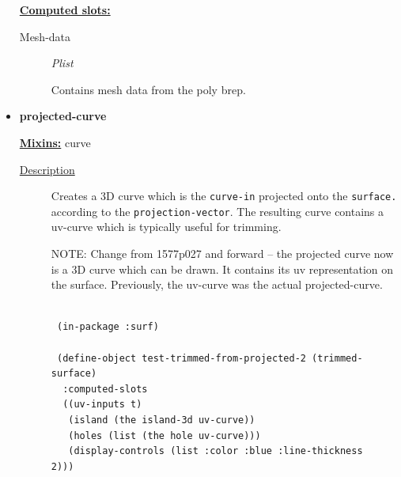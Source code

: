 \documentclass [11pt]{book}
\begin{document}
\begin{itemize}
\textbf{
\underline{Computed slots:}}

\begin{description}

\item [Mesh-data]
\emph{Plist}

 Contains mesh data from the poly brep.




\end{description}







\item {}
\label{prim:projected-curve}
\textbf{projected-curve}


\textbf{
\underline{Mixins:}} curve





\begin{description}

\item [
\underline{Description}]


Creates a 3D curve which is the \texttt{curve-in} 
projected onto the \texttt{surface.} according to the \texttt{projection-vector}. 
The resulting curve contains a uv-curve which is typically useful for trimming.

NOTE: Change from 1577p027 and forward -- the projected curve now is a 3D curve which 
can be drawn. It contains its uv representation on the surface. Previously, the uv-curve
was the actual projected-curve.





\end{description}




\begin{figure}
\begin{lrbox}{\boxedverb}
\begin{minipage}{\linewidth}
{\small

\begin{verbatim}

 (in-package :surf)

 (define-object test-trimmed-from-projected-2 (trimmed-surface)
  :computed-slots
  ((uv-inputs t)
   (island (the island-3d uv-curve))
   (holes (list (the hole uv-curve)))
   (display-controls (list :color :blue :line-thickness 2)))
  

\end{verbatim}}
\end{minipage}
\end{lrbox}
\end{figure}
\end{itemize}
\end{document}
